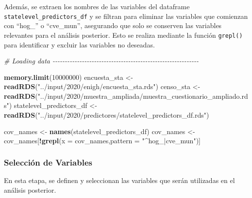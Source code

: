 \documentclass[
  12pt,
]{book}
\newenvironment{Shaded}{\begin{snugshade}}{\end{snugshade}}
\newcommand{\AttributeTok}[1]{\textcolor[rgb]{0.13,0.29,0.53}{#1}}
\newcommand{\CommentTok}[1]{\textcolor[rgb]{0.56,0.35,0.01}{\textit{#1}}}
\newcommand{\DecValTok}[1]{\textcolor[rgb]{0.00,0.00,0.81}{#1}}
\newcommand{\FunctionTok}[1]{\textcolor[rgb]{0.13,0.29,0.53}{\textbf{#1}}}
\newcommand{\NormalTok}[1]{#1}
\newcommand{\OtherTok}[1]{\textcolor[rgb]{0.56,0.35,0.01}{#1}}
\newcommand{\SpecialCharTok}[1]{\textcolor[rgb]{0.81,0.36,0.00}{\textbf{#1}}}
\newcommand{\StringTok}[1]{\textcolor[rgb]{0.31,0.60,0.02}{#1}}
\begin{document}
Además, se extraen los nombres de las variables del dataframe \texttt{statelevel\_predictors\_df} y se filtran para eliminar las variables que comienzan con ``hog\_'' o ``cve\_mun'', asegurando que solo se conserven las variables relevantes para el análisis posterior. Esto se realiza mediante la función \texttt{grepl()} para identificar y excluir las variables no deseadas.

\begin{Shaded}
\begin{Highlighting}[]
\CommentTok{\# Loading data {-}{-}{-}{-}{-}{-}{-}{-}{-}{-}{-}{-}{-}{-}{-}{-}{-}{-}{-}{-}{-}{-}{-}{-}{-}{-}{-}{-}{-}{-}{-}{-}{-}{-}{-}{-}{-}{-}{-}{-}{-}{-}{-}{-}{-}{-}{-}{-}{-}{-}{-}{-}{-}{-}{-}{-}{-}{-}{-}{-}}

\FunctionTok{memory.limit}\NormalTok{(}\DecValTok{10000000}\NormalTok{)}
\NormalTok{encuesta\_sta }\OtherTok{\textless{}{-}} \FunctionTok{readRDS}\NormalTok{(}\StringTok{"../input/2020/enigh/encuesta\_sta.rds"}\NormalTok{)}
\NormalTok{censo\_sta }\OtherTok{\textless{}{-}} \FunctionTok{readRDS}\NormalTok{(}\StringTok{"../input/2020/muestra\_ampliada/muestra\_cuestionario\_ampliado.rds"}\NormalTok{)}
\NormalTok{statelevel\_predictors\_df }\OtherTok{\textless{}{-}} \FunctionTok{readRDS}\NormalTok{(}\StringTok{"../input/2020/predictores/statelevel\_predictors\_df.rds"}\NormalTok{)}

\NormalTok{cov\_names }\OtherTok{\textless{}{-}} \FunctionTok{names}\NormalTok{(statelevel\_predictors\_df)}
\NormalTok{cov\_names }\OtherTok{\textless{}{-}}\NormalTok{ cov\_names[}\SpecialCharTok{!}\FunctionTok{grepl}\NormalTok{(}\AttributeTok{x =}\NormalTok{ cov\_names,}\AttributeTok{pattern =} \StringTok{"\^{}hog\_|cve\_mun"}\NormalTok{)]}
\end{Highlighting}
\end{Shaded}

\hypertarget{selecciuxf3n-de-variables-1}{%
\subsubsection*{Selección de Variables}\label{selecciuxf3n-de-variables-1}}

En esta etapa, se definen y seleccionan las variables que serán utilizadas en el análisis posterior.
\end{document}
